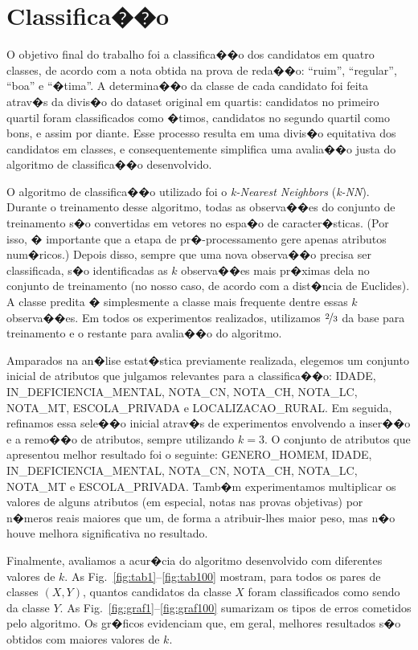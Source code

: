 \documentclass[12pt]{article}
\begin{document}
\section{Classifica��o}
O objetivo final do trabalho foi a classifica��o dos candidatos em quatro classes, de acordo com a nota obtida na prova de reda��o: ``ruim'', ``regular'', ``boa'' e ``�tima''.
A determina��o da classe de cada candidato foi feita atrav�s da divis�o do dataset original em quartis: candidatos no primeiro quartil foram classificados como �timos, candidatos no segundo quartil como bons, e assim por diante.
Esse processo resulta em uma divis�o equitativa dos candidatos em classes, e consequentemente simplifica uma avalia��o justa do algoritmo de classifica��o desenvolvido.

O algoritmo de classifica��o utilizado foi o \emph{k-Nearest Neighbors} (\emph{k-NN}).
Durante o treinamento desse algoritmo, todas as observa��es do conjunto de treinamento s�o convertidas em vetores no espa�o de caracter�sticas.
(Por isso, � importante que a etapa de pr�-processamento gere apenas atributos num�ricos.)
Depois disso, sempre que uma nova observa��o precisa ser classificada, s�o identificadas as $k$ observa��es mais pr�ximas dela no conjunto de treinamento (no nosso caso, de acordo com a dist�ncia de Euclides).
A classe predita � simplesmente a classe mais frequente dentre essas $k$ observa��es.
Em todos os experimentos realizados, utilizamos $\nicefrac{2}{3}$ da base para treinamento e o restante para avalia��o do algoritmo.

Amparados na an�lise estat�stica previamente realizada, elegemos um conjunto inicial de atributos que julgamos relevantes para a classifica��o: IDADE, IN\_DEFICIENCIA\_MENTAL, NOTA\_CN, NOTA\_CH, NOTA\_LC, NOTA\_MT, ESCOLA\_PRIVADA e LOCALIZACAO\_RURAL.
Em seguida, refinamos essa sele��o inicial atrav�s de experimentos envolvendo a inser��o e a remo��o de atributos, sempre utilizando $k=3$.
O conjunto de atributos que apresentou melhor resultado foi o seguinte: GENERO\_HOMEM, IDADE, IN\_DEFICIENCIA\_MENTAL, NOTA\_CN, NOTA\_CH, NOTA\_LC, NOTA\_MT e ESCOLA\_PRIVADA.
Tamb�m experimentamos multiplicar os valores de alguns atributos (em especial, notas nas provas objetivas) por n�meros reais maiores que um, de forma a atribuir-lhes maior peso, mas n�o houve melhora significativa no resultado.

Finalmente, avaliamos a acur�cia do algoritmo desenvolvido com diferentes valores de $k$.
As Fig.~\ref{fig:tab1}--\ref{fig:tab100} mostram, para todos os pares de classes $(X, Y)$, quantos candidatos da classe $X$ foram classificados como sendo da classe $Y$.
As Fig.~\ref{fig:graf1}--\ref{fig:graf100} sumarizam os tipos de erros cometidos pelo algoritmo.
Os gr�ficos evidenciam que, em geral, melhores resultados s�o obtidos com maiores valores de $k$.
\end{document}

